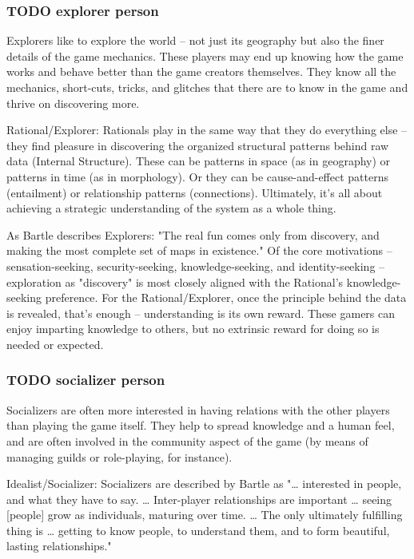 \documentclass[11pt]{article}
\begin{document}
\subsubsection{{\bfseries\sffamily TODO} explorer person}
\label{sec-2-2-10}

Explorers like to explore the world – not just its geography but also
the finer details of the game mechanics. These players may end up
knowing how the game works and behave better than the game
creators themselves. They know all the mechanics, short-cuts, tricks,
and glitches that there are to know in the game and thrive on
discovering more.

Rational/Explorer: Rationals play in the same way that they do
everything else -- they find pleasure in discovering the organized
structural patterns behind raw data (Internal Structure). These can
be patterns in space (as in geography) or patterns in time (as in
morphology). Or they can be cause-and-effect patterns (entailment) or
relationship patterns (connections). Ultimately, it's all about
achieving a strategic understanding of the system as a whole thing.

As Bartle describes Explorers: "The real fun comes only from
discovery, and making the most complete set of maps in existence." Of
the core motivations -- sensation-seeking, security-seeking,
knowledge-seeking, and identity-seeking -- exploration as "discovery"
is most closely aligned with the Rational's
knowledge-seeking preference. For the Rational/Explorer, once the
principle behind the data is revealed, that's enough -- understanding
is its own reward. These gamers can enjoy imparting knowledge to
others, but no extrinsic reward for doing so is needed or expected.
\subsubsection{{\bfseries\sffamily TODO} socializer person}
\label{sec-2-2-11}

Socializers are often more interested in having relations with the
other players than playing the game itself. They help to spread
knowledge and a human feel, and are often involved in the community
aspect of the game (by means of managing guilds or role-playing, for
instance).

Idealist/Socializer: Socializers are described by Bartle as
"\ldots{} interested in people, and what they have to
say. \ldots{} Inter-player relationships are important \ldots{} seeing [people]
grow as individuals, maturing over time. \ldots{} The only ultimately
fulfilling thing is \ldots{} getting to know people, to understand them,
and to form beautiful, lasting relationships."
\end{document}
